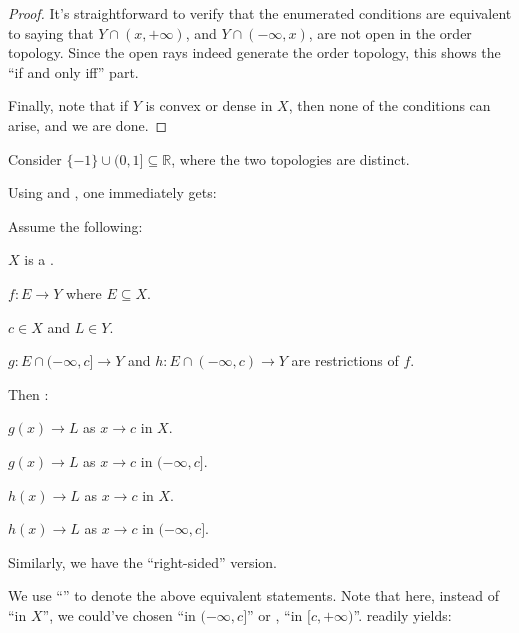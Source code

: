 	\begin{proof}
		It's straightforward to verify that the enumerated conditions are equivalent to saying that $Y\cap (x, +\infty)$, and \resp $Y\cap (-\infty, x)$, are not open in the order topology. Since the open rays indeed generate the order topology, this shows the ``if and only iff'' part.
		
		Finally, note that if $Y$ is convex or dense in $X$, then none of the conditions can arise, and we are done.
	\end{proof}
	
	\begin{rmk}
		Consider $\{-1\}\cup(0, 1]\subseteq \mathbb R$, where the two topologies are distinct.
	\end{rmk}
	
	
	Using  and , one immediately gets:
	
	\begin{lem}
		Assume the following:
		\begin{assmplist}
			\item $X$ is a \LOTS.
			\item $f\colon E\to Y$ where $E\subseteq X$.
			\item $c\in X$ and $L\in Y$.
			\item $g\colon E\cap(-\infty, c]\to Y$ and $h\colon E\cap(-\infty, c)\to Y$ are restrictions of $f$.
		\end{assmplist}
		Then \tfae:
		\begin{mylist}
			\item $g(x)\to L$ as $x\to c$ in $X$.
			\item $g(x)\to L$ as $x\to c$ in $(-\infty, c]$.
			\item $h(x)\to L$ as $x\to c$ in $X$.
			\item $h(x)\to L$ as $x\to c$ in $(-\infty, c]$.
		\end{mylist}
		
		Similarly, we have the ``right-sided'' version.
	\end{lem}
	
	We use ``'' to denote the above equivalent statements. Note that here, instead of ``in $X$'', we could've chosen ``in $(-\infty, c]$'' or \resp, ``in $[c, +\infty)$''.  readily yields:
	

